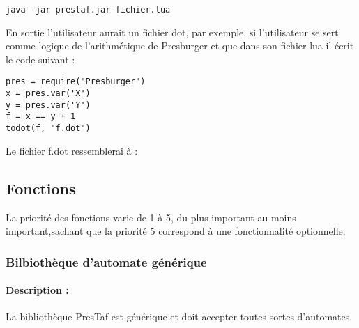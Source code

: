 \documentclass{article}%
\begin{document}
\begin{lstlisting}[mathescape=true, frame=single]
java -jar prestaf.jar fichier.lua
\end{lstlisting}

En sortie l'utilisateur aurait un fichier dot, par exemple, si l'utilisateur se sert comme logique de l'arithmétique de Presburger et que dans son fichier lua il écrit le code suivant :

\begin{lstlisting}[mathescape=true, frame=single]
pres = require("Presburger")
x = pres.var('X')
y = pres.var('Y')
f = x == y + 1
todot(f, "f.dot")
\end{lstlisting}

Le fichier f.dot ressemblerai à :


\subsection{Fonctions}

La priorité des fonctions varie de 1 à 5, du plus important au moins important,sachant que la priorité 5 correspond à une fonctionnalité optionnelle.

\subsubsection{Bilbiothèque d'automate générique}

\paragraph{Description :} La bibliothèque PresTaf est générique et doit accepter toutes sortes d'automates.
\end{document}
